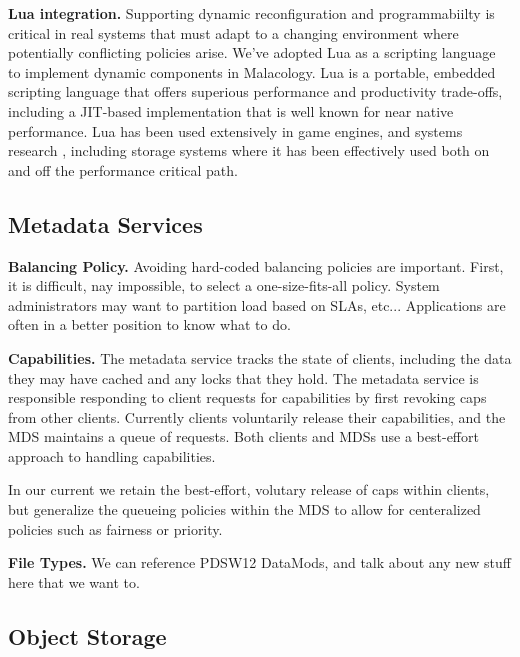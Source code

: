 \documentclass[10pt,twocolumn]{article}
\begin{document}
{\bf Lua integration.}
Supporting dynamic reconfiguration and programmabiilty is critical in real
systems that must adapt to a changing environment where potentially
conflicting policies arise. We've adopted Lua as a scripting language to
implement dynamic components in Malacology.  Lua is a portable, embedded
scripting language that offers superious performance and productivity
trade-offs, including a JIT-based implementation that is well known for near
native performance. Lua has been used extensively in game engines, and systems
research \cite{neto:dls14-luaos}, including storage systems where it has been
effectively used both on
\cite{grawinkel:pdsw2012-lua,watkins2013:bdmc13-in-vivo} and off
\cite{sevilla:sc15-mantle} the performance critical path.

\subsection{Metadata Services}

%

{\bf Balancing Policy.}
Avoiding hard-coded balancing policies are important. First, it is difficult,
nay impossible, to select a one-size-fits-all policy. System administrators
may want to partition load based on SLAs, etc... Applications are often in
a better position to know what to do.

{\bf Capabilities.}
The metadata service tracks the state of clients, including the data they
may have cached and any locks that they hold. The metadata service is
responsible responding to client requests for capabilities by first
revoking caps from other clients. Currently clients voluntarily
release their capabilities, and the MDS maintains a queue of requests.
Both clients and MDSs use a best-effort approach to handling capabilities.

In our current we retain the best-effort, volutary release of caps within
clients, but generalize the queueing policies within the MDS to allow for
centeralized policies such as fairness or priority.

{\bf File Types.}
We can reference PDSW12 DataMods, and talk about any new stuff here that we
want to.

\subsection{Object Storage}
\end{document}
